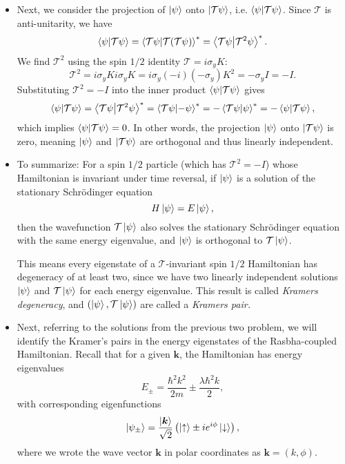 \documentclass[11pt, a4paper]{article}
\newcommand{\Schro}{Schr\"{o}dinger\xspace}
\newcommand{\Ham}{Hamiltonian\xspace}
\renewcommand{\vec}[1]{\bm{#1}} %
\newcommand{\ua}{\uparrow}  %
\newcommand{\da}{\downarrow}  %
\renewcommand{\k}{\vec{k}}  %
\newcommand{\T}{\mathcal{T}}  %
\begin{document}
\begin{itemize}
	\item Next, we consider the projection of $ \ket{\psi} $ onto $ \ket{\T \psi} $, i.e. $ \braket{\psi}{\T\psi} $. Since $ \T $ is anti-unitarity, we have
	\begin{equation*}
		\braket{\psi}{\T\psi} = \braket{\T\psi}{\T(\T\psi)}^{*} = \braket{\T\psi}{\T^{2}\psi}^{*}.
	\end{equation*}
	We find $ \T^{2} $ using the spin $ 1/2 $ identity $ \T = i \sigma_{y}K $:
	\begin{equation*}
		\T^{2} = i \sigma_{y}K i\sigma_{y}K = i\sigma_{y}(-i)(-\sigma_{y})K^{2} = -\sigma_{y} I = - I.
	\end{equation*}
	Substituting $ \T^{2} = - I $ into the inner product $ \braket{\psi}{\T\psi} $ gives
	\begin{equation*}
		\braket{\psi}{\T\psi} = \braket{\T\psi}{\T^{2}\psi}^{*} = \braket{\T\psi}{-\psi}^{*} = -\braket{\T\psi}{\psi}^{*} = - \braket{\psi}{\T\psi},
	\end{equation*}
	which implies $ \braket{\psi}{\T\psi} = 0 $. In other words, the projection  $ \ket{\psi} $ onto $ \ket{\T \psi} $ is zero, meaning $ \ket{\psi} $ and $ \ket{\T \psi} $ are orthogonal and thus linearly independent.
	
	
	\item To summarize: For a spin $ 1/2 $ particle (which has $ \T^{2} = -I $) whose Hamiltonian is invariant under time reversal, if $ \ket{\psi} $ is a solution of the stationary \Schro equation
	\begin{equation*}
		H \ket{\psi} = E\ket{\psi},
	\end{equation*}
	then the wavefunction $ \T\ket{\psi} $ also solves the stationary \Schro equation with the same energy eigenvalue, and $ \ket{\psi} $ is orthogonal to $ \T \ket{\psi} $. 
	
	This means every eigenstate of a $ \T $-invariant spin $ 1/2 $ Hamiltonian has degeneracy of at least two, since we have two linearly independent solutions $ \ket{\psi} $ and $ \T \ket{\psi} $ for each energy eigenvalue. This result is called \textit{Kramers degeneracy}, and $ (\ket{\psi}, \T\ket{\psi}) $ are called a \textit{Kramers pair. }

	\item Next, referring to the solutions from the previous two problem, we will identify the Kramer's pairs in the energy eigenstates of the Rasbha-coupled Hamiltonian. Recall that for a given $ \k $, the \Ham has energy eigenvalues
	\begin{equation*}
		E_{\pm} = \frac{\hbar^{2}k^{2}}{2m} \pm \frac{\lambda\hbar^{2}k}{2},
	\end{equation*}
	with corresponding eigenfunctions
	\begin{equation*}
		\ket{\psi_{\pm}} = \frac{\ket{\k}}{\sqrt{2}}\left(\ket{\ua} \pm ie^{i\phi}\ket{\da}\right),
	\end{equation*}
	where we wrote the wave vector $ \k $ in polar coordinates as $ \k = (k, \phi) $. 
	

\end{itemize}
\end{document}
